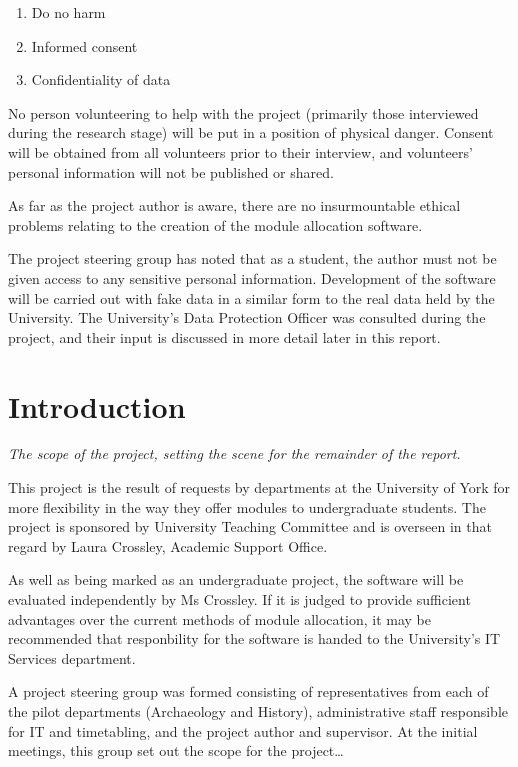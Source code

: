 \documentclass[]{scrartcl}
\begin{document}
\begin{enumerate}
  \item Do no harm
  \item Informed consent
  \item Confidentiality of data
\end{enumerate}

No person volunteering to help with the project (primarily those interviewed during the research stage) will be put in a position of physical danger. Consent will be obtained from all volunteers prior to their interview, and volunteers' personal information will not be published or shared.

As far as the project author is aware, there are no insurmountable ethical problems relating to the creation of the module allocation software.

The project steering group has noted that as a student, the author must not be given access to any sensitive personal information. Development of the software will be carried out with fake data in a similar form to the real data held by the University. The University's Data Protection Officer was consulted during the project, and their input is discussed in more detail later in this report.

\section{Introduction}

\textit{The scope of the project, setting the scene for the remainder of the report.}

This project is the result of requests by departments at the University of York for more flexibility in the way they offer modules to undergraduate students. The project is sponsored by University Teaching Committee and is overseen in that regard by Laura Crossley, Academic Support Office.

As well as being marked as an undergraduate project, the software will be evaluated independently by Ms Crossley. If it is judged to provide sufficient advantages over the current methods of module allocation, it may be recommended that responbility for the software is handed to the University's IT Services department.

A project steering group was formed consisting of representatives from each of the pilot departments (Archaeology and History), administrative staff responsible for IT and timetabling, and the project author and supervisor. At the initial meetings, this group set out the scope for the project…
\end{document}
